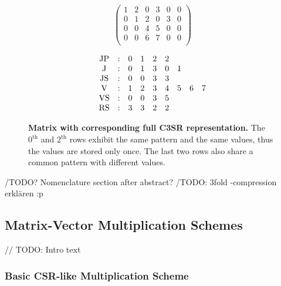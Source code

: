 \documentclass{article}
\begin{document}
    \begin{figure}[ht]
      \centering
      \begin{minipage}{0.4\textwidth}
        \centering
        $$
        \begin{pmatrix}
          1 & 2 & 0 & 3 & 0 & 0 \\
          0 & 1 & 2 & 0 & 3 & 0 \\
          0 & 0 & 4 & 5 & 0 & 0 \\
          0 & 0 & 6 & 7 & 0 & 0 \\
        \end{pmatrix}
        $$
      \end{minipage}
      \begin{minipage}{0.4\textwidth}
        \centering
        $$
        \begin{matrix}
          \JP & : & 0 & 1 & 2 & 2 &   &   &   \\
           \J & : & 0 & 1 & 3 & 0 & 1 &   &   \\
          \JS & : & 0 & 0 & 3 & 3 &   &   &   \\
           \V & : & 1 & 2 & 3 & 4 & 5 & 6 & 7 \\
          \VS & : & 0 & 0 & 3 & 5 &   &   &   \\
         \RS & : & 3 & 3 & 2 & 2 &   &   &   \\
        \end{matrix}
        $$
      \end{minipage}
      \caption[Matrix with corresponding full C3SR representation.]{\textbf{Matrix with corresponding full C3SR representation.} The $0^{\text{th}}$ and $2^{\text{th}}$ rows exhibit the same pattern and the same values, thus the values are stored only once. The last two rows also share a common pattern with different values.}
      \label{fig:c3sr_example_full}
    \end{figure}

    /TODO? Nomenclature section after abstract?
    /TODO: 3fold -compression erklären :p

  \subsection{Matrix-Vector Multiplication Schemes} \label{subsec:matrix-vector-multiplication-schemes}

    // TODO: Intro text

    \subsubsection{Basic CSR-like Multiplication Scheme} \label{subsubsec:basic-csr-like-multiplication-scheme}
\end{document}
